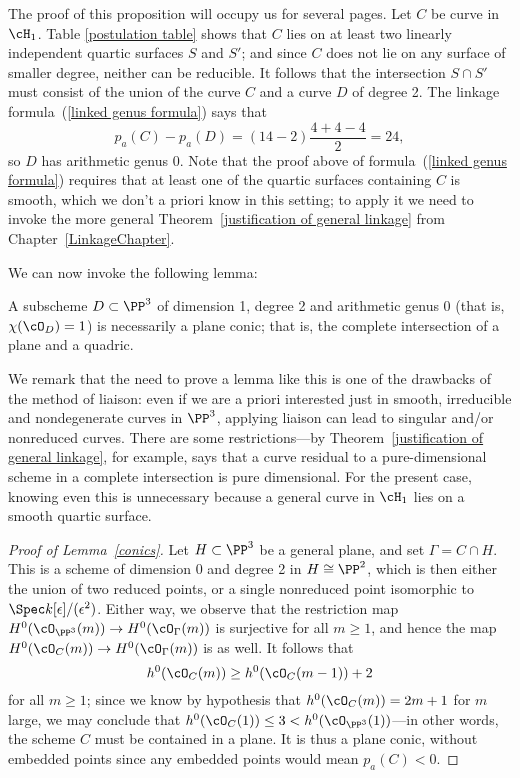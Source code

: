 The proof of this proposition will occupy us for several pages. Let $C$ be curve in $\cH_1$. Table \ref{postulation table} shows that $C$ lies on at least two linearly independent quartic surfaces $S$ and $S'$; and since $C$ does not lie on any surface of smaller degree, neither can be reducible. It follows that the intersection $S \cap S'$ must consist of the union of the curve $C$ and a curve $D$ of degree 2. The linkage formula~(\ref{linked genus formula}) says that
$$
p_a(C) - p_{a}(D) = (14 - 2)\frac{4+4-4}{2} = 24,
$$
so $D$ has arithmetic genus 0. Note that the proof above of formula~(\ref{linked genus formula}) requires that at least one of the quartic surfaces containing $C$ is smooth, which we don't a priori know in this setting; to apply it we need to invoke the more general Theorem~\ref{justification of general linkage} from Chapter~\ref{LinkageChapter}.

We can now invoke the following lemma:

\begin{lemma}\label{conics}
A subscheme $D \subset \PP^3$ of dimension 1, degree 2 and arithmetic genus 0 (that is, $\chi(\cO_D) = 1$) is necessarily a plane conic; that is, the complete intersection of a plane and a quadric.
\end{lemma}

We remark that the need to prove a lemma like this is one of the drawbacks of the method of liaison: even if we are a priori interested just in smooth, irreducible and nondegenerate curves in $\PP^3$, applying liaison can lead to  singular and/or nonreduced curves. There are some restrictions---by Theorem~\ref{justification of general linkage}, for example, says that a curve residual to a pure-dimensional scheme in a complete intersection is pure dimensional. For the present case, knowing even this is unnecessary because  a general curve in $\cH_1$ lies on a smooth quartic surface.

\begin{proof}[Proof of Lemma~\ref{conics}]
Let $H \subset \PP^3$ be a general plane, and set $\Gamma = C \cap H$. This is a scheme of dimension 0 and degree 2 in $H \cong \PP^2$, which is then either the union of two reduced points, or a single nonreduced point isomorphic to $\Spec k[\epsilon]/(\epsilon^2)$. Either way, we observe that the restriction map $H^0(\cO_{\PP^3}(m)) \to H^0(\cO_{\Gamma}(m))$ is surjective for all $m \geq 1$, and hence the map $H^0(\cO_{C}(m)) \to H^0(\cO_{\Gamma}(m))$ is as well. It follows that
    $$
    h^0(\cO_C(m)) \geq h^0(\cO_C(m-1)) + 2
    $$
    for all $m \geq 1$; since we know by  hypothesis that $h^0(\cO_C(m)) = 2m+1$ for $m$ large, we may conclude that $h^0(\cO_C(1)) \leq 3 < h^0(\cO_{\PP^3}(1))$---in other words, the scheme $C$ must be contained in a plane. It is thus a plane conic, without embedded points since any embedded points would mean $p_a(C) < 0$.
\end{proof}

